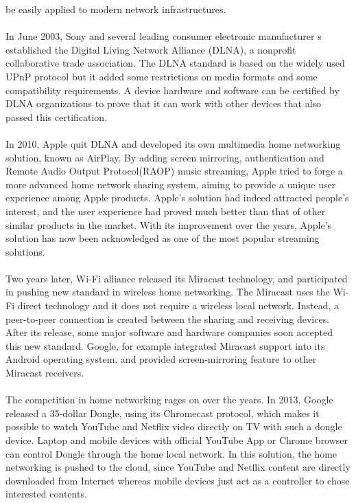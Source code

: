 be easily applied to modern network infrastructures.\\
\\ 
In June 2003, Sony and several leading consumer electronic manufacturer s
established the Digital Living Network Alliance (DLNA), a nonprofit 
collaborative trade association. The DLNA standard is based on the widely used UPnP 
protocol but it added some restrictions on media formats and some compatibility 
requirements. A device hardware and software can be certified by DLNA 
organizations to prove that it can work with other devices that also passed 
this certification. \\
\\
In 2010, Apple quit DLNA and developed its own multimedia home networking 
solution, known as AirPlay. By adding screen mirroring, authentication and Remote 
Audio Output Protocol(RAOP) music streaming, Apple tried to forge a more advanced 
home network sharing system, aiming to provide a unique user experience among Apple 
products. Apple's solution had indeed attracted people's interest, and the user experience 
had proved much better than that of other similar products in the market. With its improvement
 over the years,  Apple's solution has now been acknowledged as one of the most popular streaming 
solutions.\\
\\
Two years later, Wi-Fi alliance released its Miracast technology, and 
participated in pushing new standard in wireless home networking. The Miracast 
uses the Wi-Fi direct technology and it does not require a wireless local 
network. Instead, a peer-to-peer connection is created between the sharing and 
receiving devices. After its release, some major software and hardware 
companies soon accepted this new standard. Google, for example integrated Miracast 
support into its Android operating system, and provided screen-mirroring feature 
to other Miracast receivers. \\
\\
The competition in home networking rages on over the years. In 2013, Google released a 35-dollar 
Dongle, using its Chromecast protocol, which makes it possible to watch 
YouTube and Netflix video directly on TV with such a dongle device. Laptop and mobile 
devices with official YouTube App or Chrome browser can control Dongle 
through the home local network. In this solution, the home networking is pushed to the 
cloud, since YouTube and Netflix content are directly downloaded from Internet whereas
mobile devices just act as a controller to chose interested contents. \\
